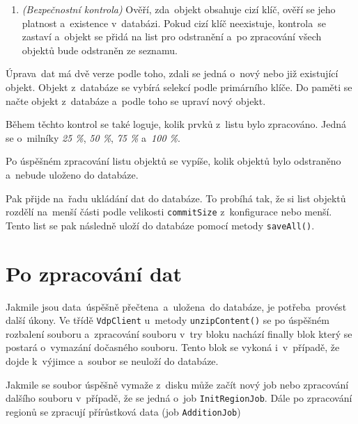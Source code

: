 \begin{enumerate}
    \item \textit{(Bezpečnostní kontrola)} Ověří, zda~objekt obsahuje cizí klíč, ověří se jeho platnost a~existence v~databázi.
    Pokud cizí klíč neexistuje, kontrola~se zastaví a~objekt se přidá na list pro odstranění a~po zpracování všech objektů
    bude odstraněn ze seznamu.
\end{enumerate}

Úprava~dat má dvě verze podle toho, zdali se jedná o~nový nebo již existující objekt.
Objekt z~databáze se vybírá selekcí podle primárního klíče.
Do paměti se načte objekt z~databáze a~podle toho se upraví nový objekt.

Během těchto kontrol se také loguje, kolik prvků z~listu bylo zpracováno.
Jedná se o~milníky \textit{25 \%}, \textit{50 \%}, \textit{75 \%} a~\textit{100 \%}.

Po úspěšném zpracování listu objektů se vypíše, kolik objektů bylo odstraněno a~nebude uloženo do databáze.

Pak přijde na~řadu ukládání dat do databáze.
To probíhá tak, že si list objektů rozdělí na~menší části podle velikosti \texttt{commitSize} z~konfigurace nebo menší.
Tento list se pak následně uloží do databáze pomocí metody \texttt{saveAll()}.

\section{Po zpracování dat}
Jakmile jsou data~úspěšně přečtena~a~uložena~do databáze, je potřeba~provést další úkony.
Ve třídě \texttt{VdpClient} u~metody \texttt{unzipContent()} se po úspěšném rozbalení souboru
a~zpracování souboru v~try bloku nachází finally blok který se postará o~vymazání dočasného souboru.
Tento blok se vykoná i~v~případě, že dojde k~výjimce a~soubor se neuloží do databáze.

Jakmile se soubor úspěšně vymaže z~disku může začít nový job nebo zpracování dalšího souboru
v~případě, že se jedná o~job \texttt{InitRegionJob}. 
Dále po zpracování regionů se zpracují přírůstková data (job \texttt{AdditionJob})